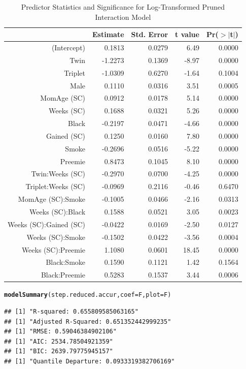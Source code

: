 \documentclass{article}\usepackage[]{graphicx}\usepackage[]{xcolor}
\makeatletter
\newcommand{\hlstd}[1]{\textcolor[rgb]{0.345,0.345,0.345}{#1}}%
\newcommand{\hlkwc}[1]{\textcolor[rgb]{0.333,0.667,0.333}{#1}}%
\newcommand{\hlkwd}[1]{\textcolor[rgb]{0.737,0.353,0.396}{\textbf{#1}}}%
\newenvironment{kframe}{%
 \def\at@end@of@kframe{}%
 \ifinner\ifhmode%
  \def\at@end@of@kframe{\end{minipage}}%
  \begin{minipage}{\columnwidth}%
 \fi\fi%
 \def\FrameCommand##1{\hskip\@totalleftmargin \hskip-\fboxsep
 \colorbox{shadecolor}{##1}\hskip-\fboxsep
     \hskip-\linewidth \hskip-\@totalleftmargin \hskip\columnwidth}%
 \MakeFramed {\advance\hsize-\width
   \@totalleftmargin\z@ \linewidth\hsize
   \@setminipage}}%
 {\par\unskip\endMakeFramed%
 \at@end@of@kframe}
\newenvironment{knitrout}{}{} %
\makeatother
\begin{document}
\begin{table}[ht]
\centering
\begin{tabular}{rrrrr}
  \hline
 & Estimate & Std. Error & t value & Pr($>$$|$t$|$) \\ 
  \hline
(Intercept) & 0.1813 & 0.0279 & 6.49 & 0.0000 \\ 
  Twin & -1.2273 & 0.1369 & -8.97 & 0.0000 \\ 
  Triplet & -1.0309 & 0.6270 & -1.64 & 0.1004 \\ 
  Male & 0.1110 & 0.0316 & 3.51 & 0.0005 \\ 
  MomAge (SC) & 0.0912 & 0.0178 & 5.14 & 0.0000 \\ 
  Weeks (SC) & 0.1688 & 0.0321 & 5.26 & 0.0000 \\ 
  Black & -0.2197 & 0.0471 & -4.66 & 0.0000 \\ 
  Gained (SC) & 0.1250 & 0.0160 & 7.80 & 0.0000 \\ 
  Smoke & -0.2696 & 0.0516 & -5.22 & 0.0000 \\ 
  Preemie & 0.8473 & 0.1045 & 8.10 & 0.0000 \\ 
  Twin:Weeks (SC) & -0.2970 & 0.0700 & -4.25 & 0.0000 \\ 
  Triplet:Weeks (SC) & -0.0969 & 0.2116 & -0.46 & 0.6470 \\ 
  MomAge (SC):Smoke & -0.1005 & 0.0466 & -2.16 & 0.0313 \\ 
  Weeks (SC):Black & 0.1588 & 0.0521 & 3.05 & 0.0023 \\ 
  Weeks (SC):Gained (SC) & -0.0422 & 0.0169 & -2.50 & 0.0127 \\ 
  Weeks (SC):Smoke & -0.1502 & 0.0422 & -3.56 & 0.0004 \\ 
  Weeks (SC):Preemie & 1.1080 & 0.0601 & 18.45 & 0.0000 \\ 
  Black:Smoke & 0.1590 & 0.1121 & 1.42 & 0.1564 \\ 
  Black:Preemie & 0.5283 & 0.1537 & 3.44 & 0.0006 \\ 
   \hline
\end{tabular}
\caption{Predictor Statistics and Significance for Log-Transformed Pruned Interaction Model} 
\label{interact.model.log.prune}
\end{table}
\begin{knitrout}
\color{fgcolor}\begin{kframe}
\begin{alltt}
\hlkwd{modelSummary}\hlstd{(step.reduced.accur,} \hlkwc{coef}\hlstd{=F,} \hlkwc{plot}\hlstd{=F)}
\end{alltt}
\begin{verbatim}
## [1] "R-squared: 0.655809585063165"
## [1] "Adjusted R-Squared: 0.651352442999235"
## [1] "RMSE: 0.59046384902106"
## [1] "AIC: 2534.78504921359"
## [1] "BIC: 2639.79775945157"
## [1] "Quantile Departure: 0.0933319382706169"
\end{verbatim}
\end{kframe}
\end{knitrout}
\end{document}
